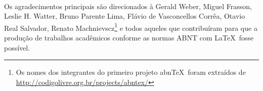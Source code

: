 \documentclass[
	12pt,				%
	openright,			%
	oneside,			%
	a4paper,			%
	chapter=TITLE,		%
	english,			%
	french,				%
	spanish,			%
	brazil				%
	]{abntex2}
\newif\iffinal
\begin{document}
{\begin{folhadeaprovacao}
{\begin{center}
      \begin{center}
        \bfseries\large\ImprimirTitulo
      \end{center}
      
      \vspace*{\fill}
    
      \hspace{.45\textwidth}
      \begin{minipage}{.5\textwidth}
          \imprimirpreambulo
      \end{minipage}%
      \vspace*{\fill}
     \end{center}
        

      \vspace*{0.5cm}
      \hspace{.5\textwidth}
     \begin{center} 
       \ImprimirLocal \\ \imprimirdata
     \end{center}
  }
\end{folhadeaprovacao}

\iffinal
  \begin{dedicatoria} 
   \vspace*{\fill}
   \centering
   \noindent
   \textit{ Este trabalho é dedicado às crianças adultas que,\\
   quando pequenas, sonharam em se tornar cientistas.} \vspace*{\fill}
  \end{dedicatoria}
\fi

\iffinal
  \begin{agradecimentos}
Os agradecimentos principais são direcionados à Gerald Weber, Miguel Frasson,
Leslie H. Watter, Bruno Parente Lima, Flávio de Vasconcellos Corrêa, Otavio Real
Salvador, Renato Machnievscz\footnote{Os nomes dos integrantes do primeiro
projeto abn\TeX\ foram extraídos de
\url{http://codigolivre.org.br/projects/abntex/}} e todos aqueles que
contribuíram para que a produção de trabalhos acadêmicos conforme
as normas ABNT com \LaTeX\ fosse possível.


\end{agradecimentos}}
\end{document}
